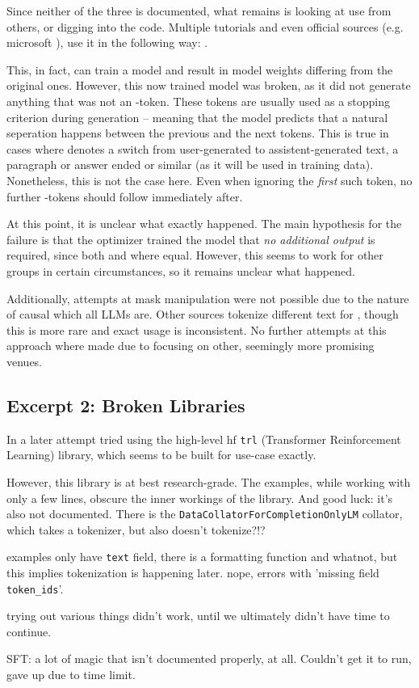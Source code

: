 Since neither of the three is documented, what remains is looking at use from others, or digging into the code.
Multiple tutorials and even official sources (e.g. microsoft \cite{deepspeedexamples_2023}), use it in the following way: .

This, in fact, can train a model and result in model weights differing from the original ones.
However, this now trained model was broken, as it did not generate anything that was not an -token.
These tokens are usually used as a stopping criterion during generation -- meaning that the model predicts that a natural seperation happens between the previous and the next tokens. 
This is true in cases where  denotes a switch from user-generated to assistent-generated text, a paragraph or answer ended or similar (as it will be used in training data).
Nonetheless, this is not the case here. Even when ignoring the \textit{first} such token, no further -tokens should follow immediately after.

At this point, it is unclear what exactly happened.
The main hypothesis for the failure is that the optimizer trained the model that \textit{no additional output} is required, since both  and  where equal.
However, this seems to work for other groups in certain circumstances, so it remains unclear what happened.

Additionally, attempts at mask manipulation were not possible due to the nature of \gls{causal} which all \glspl{LLM} are.
Other sources tokenize different text for , though this is more rare and exact usage is inconsistent.
No further attempts at this approach where made due to focusing on other, seemingly more promising venues.


\subsection{Excerpt 2: Broken Libraries}\label{sub:libraries}
In a later attempt  tried using the high-level \gls{hf} \verb`trl` (Transformer Reinforcement Learning) library, which seems to be built for  use-case exactly.

{
\color{blue}
However, this library is at best research-grade. The examples, while working with only a few lines, obscure the inner workings of the library.
And good luck: it's also not documented. There is the \verb`DataCollatorForCompletionOnlyLM` collator, which takes a tokenizer, but also doesn't tokenize?!?

examples only have \verb`text` field, there is a formatting function and whatnot, but this implies tokenization is happening later. nope, errors with 'missing field \verb`token_ids`'.

trying out various things didn't work, until we ultimately didn't have time to continue.

SFT: a lot of magic that isn't documented properly, at all. Couldn't get it to run, gave up due to time limit.
}



